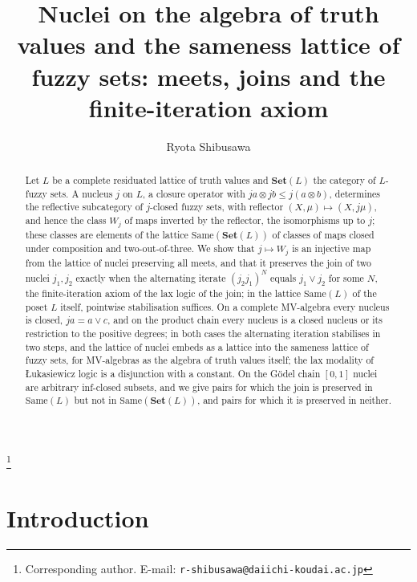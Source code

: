 \documentclass[11pt]{amsart}
\theoremstyle{definition}
\newcommand{\Same}{\mathrm{Same}}
\newcommand{\FSet}{\mathbf{Set}}
\begin{document}
\title[Nuclei and the sameness lattice of fuzzy sets]{Nuclei on the algebra of truth values and the sameness lattice of fuzzy sets: meets, joins and the finite-iteration axiom}
\author{Ryota Shibusawa}
\thanks{Corresponding author. E-mail: \texttt{r-shibusawa@daiichi-koudai.ac.jp}}
\address{Daiichi Institute of Technology}

\begin{abstract}
Let $L$ be a complete residuated lattice of truth values and $\FSet(L)$ the
category of $L$-fuzzy sets. A nucleus $j$ on $L$, a closure operator with
$ja\otimes jb\le j(a\otimes b)$, determines the reflective subcategory of
$j$-closed fuzzy sets, with reflector $(X,\mu)\mapsto(X,j\mu)$, and hence the
class $W_j$ of maps inverted by the reflector, the isomorphisms up to $j$;
these classes are elements of the lattice $\Same(\FSet(L))$ of classes of
maps closed under composition and two-out-of-three. We show that
$j\mapsto W_j$ is an injective map from the lattice of nuclei preserving all
meets, and that it preserves the join of two nuclei $j_1,j_2$ exactly when
the alternating iterate $(j_2j_1)^N$ equals $j_1\vee j_2$ for some $N$, the
finite-iteration axiom of the lax logic of the join; in the lattice
$\Same(L)$ of the poset $L$ itself, pointwise stabilisation suffices. On a
complete MV-algebra every nucleus is closed, $ja=a\vee c$, and on the
product chain every nucleus is a closed nucleus or its restriction to the
positive degrees; in both cases the alternating iteration stabilises in two
steps, and the lattice of nuclei embeds as a lattice into the sameness
lattice of fuzzy sets, for MV-algebras as the algebra of truth values
itself; the lax modality of \L ukasiewicz logic is a disjunction with a
constant. On the G\"odel chain $[0,1]$ nuclei are arbitrary inf-closed
subsets, and we give pairs for which the join is preserved in $\Same(L)$ but
not in $\Same(\FSet(L))$, and pairs for which it is preserved in neither.
\end{abstract}

\maketitle

\section{Introduction}
\end{document}
